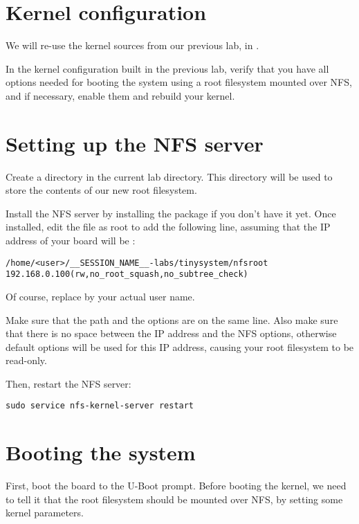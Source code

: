 \section{Kernel configuration}

We will re-use the kernel sources from our previous lab, in
.

In the kernel configuration built in the previous lab, verify that you
have all options needed for booting the system using a root filesystem
mounted over NFS, and if necessary, enable them and rebuild your
kernel.

\section{Setting up the NFS server}

Create a  directory in the current lab directory. This
 directory will be used to store the contents of our new
root filesystem.

Install the NFS server by installing the 
package if you don't have it yet. Once installed, edit the
 file as root to add the following line, assuming that the
IP address of your board will be :

\footnotesize
\begin{verbatim}
/home/<user>/__SESSION_NAME__-labs/tinysystem/nfsroot 192.168.0.100(rw,no_root_squash,no_subtree_check)
\end{verbatim}
\normalsize

Of course, replace  by your actual user name.

Make sure that the path and the options are on the same line.
Also make sure that there is no space between the IP address and the NFS
options, otherwise default options will be used for this IP address,
causing your root filesystem to be read-only.

Then, restart the NFS server:

\begin{verbatim}
sudo service nfs-kernel-server restart
\end{verbatim}

\section{Booting the system}

First, boot the board to the U-Boot prompt. Before booting the kernel,
we need to tell it that the root filesystem should be mounted over
NFS, by setting some kernel parameters.

